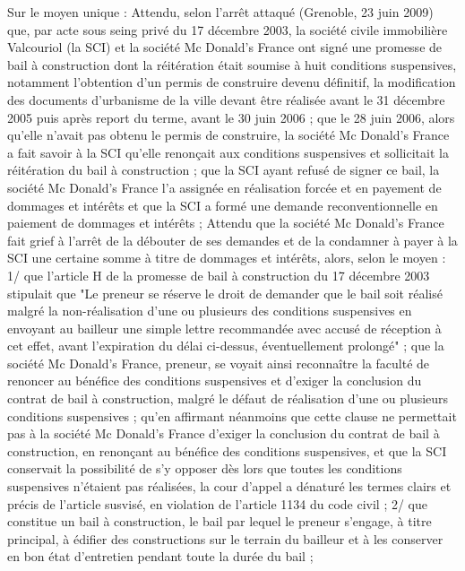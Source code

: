 \documentclass[11pt,a4paper]{report}
\begin{document}
	Sur le moyen unique :
	Attendu, selon l'arrêt attaqué (Grenoble, 23 juin 2009) que, par acte sous seing privé du 17 décembre 2003, la
	société civile immobilière Valcouriol (la SCI) et la société Mc Donald's France ont signé une promesse de bail à
	construction dont la réitération était soumise à huit conditions suspensives, notamment l'obtention d'un permis
	de construire devenu définitif, la modification des documents d'urbanisme de la ville devant être réalisée avant
	le 31 décembre 2005 puis après report du terme, avant le 30 juin 2006 ; que le 28 juin 2006, alors qu'elle n'avait
	pas obtenu le permis de construire, la société Mc Donald's France a fait savoir à la SCI qu'elle renonçait aux
	conditions suspensives et sollicitait la réitération du bail à construction ; que la SCI ayant refusé de signer ce
	bail, la société Mc Donald's France l'a assignée en réalisation forcée et en payement de dommages et intérêts et
	que la SCI a formé une demande reconventionnelle en paiement de dommages et intérêts ;
	Attendu que la société Mc Donald's France fait grief à l'arrêt de la débouter de ses demandes et de la
	condamner à payer à la SCI une certaine somme à titre de dommages et intérêts, alors, selon le moyen :
	1\degre / que l'article H de la promesse de bail à construction du 17 décembre 2003 stipulait que "Le preneur se
	réserve le droit de demander que le bail soit réalisé malgré la non-réalisation d'une ou plusieurs des conditions
	suspensives en envoyant au bailleur une simple lettre recommandée avec accusé de réception à cet effet, avant
	l'expiration du délai ci-dessus, éventuellement prolongé" ; que la société Mc Donald's France, preneur, se voyait
	ainsi reconnaître la faculté de renoncer au bénéfice des conditions suspensives et d'exiger la conclusion du
	contrat de bail à construction, malgré le défaut de réalisation d'une ou plusieurs conditions suspensives ; qu'en
	affirmant néanmoins que cette clause ne permettait pas à la société Mc Donald's France d'exiger la conclusion
	du contrat de bail à construction, en renonçant au bénéfice des conditions suspensives, et que la SCI conservait
	la possibilité de s'y opposer dès lors que toutes les conditions suspensives n'étaient pas réalisées, la cour d'appel
	a dénaturé les termes clairs et précis de l'article susvisé, en violation de l'article 1134 du code civil ;
	2\degre / que constitue un bail à construction, le bail par lequel le preneur s'engage, à titre principal, à édifier des
	constructions sur le terrain du bailleur et à les conserver en bon état d'entretien pendant toute la durée du bail ;
\end{document}
